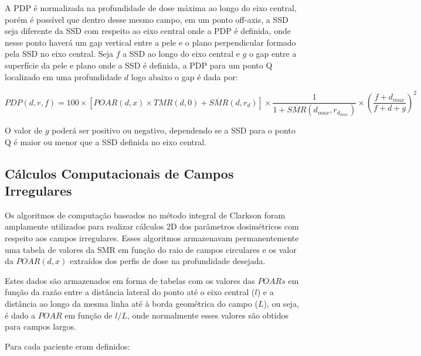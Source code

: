 \documentclass[11pt,a4paper]{article}
\begin{document}
        A PDP é normalizada na profundidade de dose máxima ao longo do eixo central, porém é possível que dentro desse mesmo campo, em um ponto off-axis, a SSD seja diferente da SSD com respeito ao eixo central onde a PDP é definida, onde nesse ponto haverá um gap vertical entre a pele e o plano perpendicular formado pela SSD no eixo central. Seja $f$ a SSD ao longo do eixo central e $g$ o gap entre a superfície da pele e plano onde a SSD é definida, a PDP para um ponto Q localizado em uma profundidade $d$ logo abaixo o gap é dada por:

            \begin{equation}
                PDP(d, r, f) = 100 \times \left[POAR(d,x) \times TMR(d,0) + \overline{SMR}(d, r_d) \right] \times \frac{1}{1 + \overline{SMR}(d_{max}, r_{d_{max}})} \times \left(\frac{f + d_{max}}{f + d + g}\right)^2
            \end{equation}


        O valor de $g$ poderá ser positivo ou negativo, dependendo se a SSD para o ponto Q é maior ou menor que a SSD definida no eixo central.


    \subsection{Cálculos Computacionais de Campos Irregulares}

        Os algoritmos de computação baseados no método integral de Clarkson foram amplamente utilizados para realizar cálculos 2D dos parâmetros dosimétricos com respeito aos campos irregulares. Esses algoritmos armazenavam permanentemente uma tabela de valores da SMR em função do raio de campos circulares e os valor da $POAR(d, x)$ extraídos dos perfis de dose na profundidade desejada.

        Estes dados são armazenados em forma de tabelas com os valores das $POARs$ em função da razão entre a distância lateral do ponto até o eixo central ($l$) e a distância ao longo da mesma linha até à borda geométrica do campo ($L$), ou seja, é dado a $POAR$ em função de $l/L$, onde normalmente esses valores são obtidos para campos largos.

        Para cada paciente eram definidos:
\end{document}
